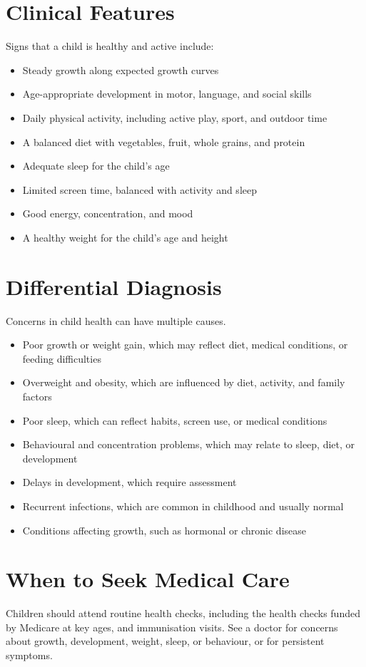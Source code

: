 \section*{Clinical Features}
Signs that a child is healthy and active include:

\begin{itemize}
    \item Steady growth along expected growth curves
    \item Age-appropriate development in motor, language, and social skills
    \item Daily physical activity, including active play, sport, and outdoor time
    \item A balanced diet with vegetables, fruit, whole grains, and protein
    \item Adequate sleep for the child's age
    \item Limited screen time, balanced with activity and sleep
    \item Good energy, concentration, and mood
    \item A healthy weight for the child's age and height
\end{itemize}

\section*{Differential Diagnosis}
Concerns in child health can have multiple causes.

\begin{itemize}
    \item Poor growth or weight gain, which may reflect diet, medical conditions, or feeding difficulties
    \item Overweight and obesity, which are influenced by diet, activity, and family factors
    \item Poor sleep, which can reflect habits, screen use, or medical conditions
    \item Behavioural and concentration problems, which may relate to sleep, diet, or development
    \item Delays in development, which require assessment
    \item Recurrent infections, which are common in childhood and usually normal
    \item Conditions affecting growth, such as hormonal or chronic disease
\end{itemize}

\section*{When to Seek Medical Care}
Children should attend routine health checks, including the health checks funded by Medicare at key ages, and immunisation visits. See a doctor for concerns about growth, development, weight, sleep, or behaviour, or for persistent symptoms.

